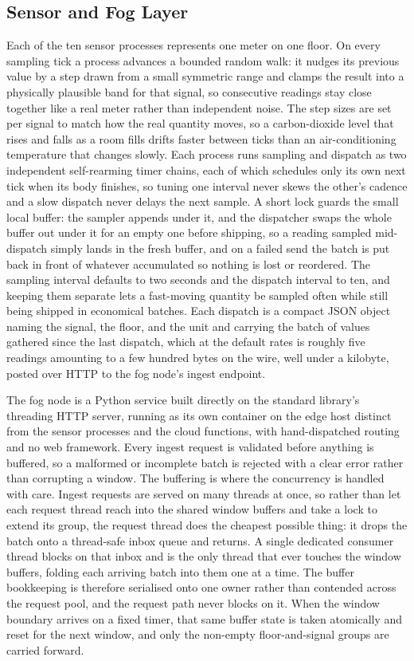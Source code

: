 \documentclass[conference]{IEEEtran}
\begin{document}
\subsection{Sensor and Fog Layer}

Each of the ten sensor processes represents one meter on one floor. On every sampling tick a process advances a bounded random walk: it nudges its previous value by a step drawn from a small symmetric range and clamps the result into a physically plausible band for that signal, so consecutive readings stay close together like a real meter rather than independent noise. The step sizes are set per signal to match how the real quantity moves, so a carbon-dioxide level that rises and falls as a room fills drifts faster between ticks than an air-conditioning temperature that changes slowly. Each process runs sampling and dispatch as two independent self-rearming timer chains, each of which schedules only its own next tick when its body finishes, so tuning one interval never skews the other's cadence and a slow dispatch never delays the next sample. A short lock guards the small local buffer: the sampler appends under it, and the dispatcher swaps the whole buffer out under it for an empty one before shipping, so a reading sampled mid-dispatch simply lands in the fresh buffer, and on a failed send the batch is put back in front of whatever accumulated so nothing is lost or reordered. The sampling interval defaults to two seconds and the dispatch interval to ten, and keeping them separate lets a fast-moving quantity be sampled often while still being shipped in economical batches. Each dispatch is a compact JSON object naming the signal, the floor, and the unit and carrying the batch of values gathered since the last dispatch, which at the default rates is roughly five readings amounting to a few hundred bytes on the wire, well under a kilobyte, posted over HTTP to the fog node's ingest endpoint.

The fog node is a Python service built directly on the standard library's threading HTTP server, running as its own container on the edge host distinct from the sensor processes and the cloud functions, with hand-dispatched routing and no web framework. Every ingest request is validated before anything is buffered, so a malformed or incomplete batch is rejected with a clear error rather than corrupting a window. The buffering is where the concurrency is handled with care. Ingest requests are served on many threads at once, so rather than let each request thread reach into the shared window buffers and take a lock to extend its group, the request thread does the cheapest possible thing: it drops the batch onto a thread-safe inbox queue and returns. A single dedicated consumer thread blocks on that inbox and is the only thread that ever touches the window buffers, folding each arriving batch into them one at a time. The buffer bookkeeping is therefore serialised onto one owner rather than contended across the request pool, and the request path never blocks on it. When the window boundary arrives on a fixed timer, that same buffer state is taken atomically and reset for the next window, and only the non-empty floor-and-signal groups are carried forward.
\end{document}
